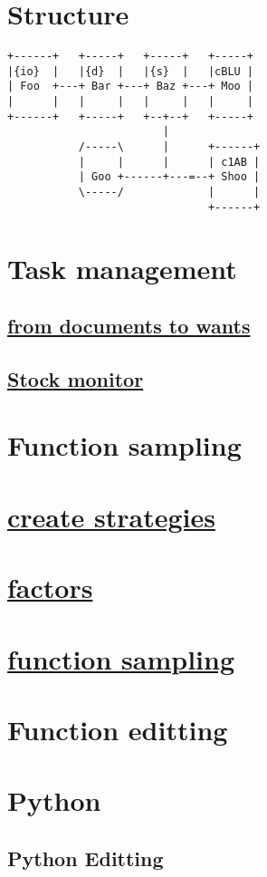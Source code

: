 \documentclass[11pt]{article}
\author{weiwu}
\date{\textit{<2017-09-27 Wed>}}
\title{}
\begin{document}
\tableofcontents


\section{Structure}
\label{sec:orgheadline1}
\begin{verbatim}
+------+   +-----+   +-----+   +-----+
|{io}  |   |{d}  |   |{s}  |   |cBLU |
| Foo  +---+ Bar +---+ Baz +---+ Moo |
|      |   |     |   |     |   |     |
+------+   +-----+   +--+--+   +-----+
                        |
           /-----\      |      +------+
           |     |      |      | c1AB |
           | Goo +------+---=--+ Shoo |
           \-----/             |      |
                               +------+
\end{verbatim}
\section{Task management}
\label{sec:orgheadline4}
\subsection{\href{./ideas_from_docs/converted_file_d64e468e.html}{from documents to wants}}
\label{sec:orgheadline2}
\subsection{\href{./Monitor_stocks}{Stock monitor}}
\label{sec:orgheadline3}

\section{Function sampling}
\label{sec:orgheadline5}
\section{\href{./create_strategies/converted_file_88cffbcb.html}{create strategies}}
\label{sec:orgheadline6}
\section{\href{./factors/converted_file_2edd553f.html}{factors}}
\label{sec:orgheadline7}
\section{\href{./function_sampling/function_sampling.html}{function sampling}}
\label{sec:orgheadline8}

\section{Function editting}
\label{sec:orgheadline9}

\section{Python}
\label{sec:orgheadline11}
\subsection{Python Editting}
\label{sec:orgheadline10}
\end{document}
